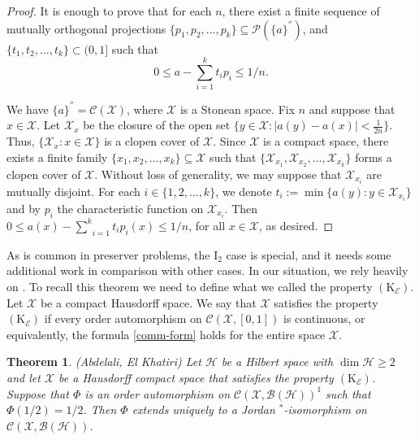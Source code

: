 \documentclass[12pt]{amsart}
\newtheorem{thm}{Theorem}[section]
\theoremstyle{definition}
\theoremstyle{remark}
\numberwithin{equation}{section}
\begin{document}
\begin{proof}
	
It is enough to prove that for each $n$, there exist a finite sequence  of  mutually orthogonal projections $\{p_1,p_2,...,p_k\}\subseteq\mathcal{P}(\{a\}^{''})$, and $\{t_1,t_2,...,t_k\}\subset(0,1]$ such that $$0 \leq a- \sum_{i=1}^{k} t_ip_i \leq 1/n. $$	
	
 	We have $\{a\}^{''} = \mathcal{C(X)}$, where $\mathcal{X}$ is a Stonean space. Fix $n$ and suppose that $x\in\mathcal{X}$. Let $\mathcal{X}_x$ be the closure of the open set $\{y\in\mathcal{X}: |a(y)-a(x)|<\frac{1}{2n}\}$. Thus, $\{\mathcal{X}_x: x\in \mathcal{X}\}$ is a clopen cover of $\mathcal{X}$. Since $\mathcal{X}$ is a compact space, there exists a finite family $\{x_1,x_2,...,x_k\}\subseteq \mathcal{X}$ such that $\{\mathcal{X}_{x_1},\mathcal{X}_{x_2},...,\mathcal{X}_{x_k}\}$  forms a clopen cover of $\mathcal{X}$. Without loss of generality, we may suppose  that $\mathcal{X}_{x_i}$  are mutually disjoint. For each $i\in\{1,2,...,k\}$,  we denote $t_i:=\min\{a(y):y\in\mathcal{X}_{x_i}\}$ and  by   $p_i$  the characteristic function on $\mathcal{X}_{x_i}$. Then $0\leq a(x)- \underset{i=1}{\overset{k}{\sum}} t_ip_i(x) \leq 1/n$, for all $x\in\mathcal{X}$, as desired.
\end{proof}













As is common in preserver problems,  the $\mathrm{I}_2$ case is  special, and
it needs some additional work in comparison with other cases. In our situation, we rely heavily  on  \cite[Theorem 2.4]{Our}. To recall this theorem we need to define what we called   the property $\left(\mathrm{K}_{\mathcal{E}}\right)$. Let  $\mathcal{X}$ be a compact  Hausdorff  space. We say that $\mathcal{X}$  satisfies the property $\left(\mathrm{K}_{\mathcal{E}}\right)$ if every order automorphism on $\mathcal{C}(\mathcal{X},[0,1])$  is continuous, or equivalently, the formula \eqref{comm-form} holds for the entire space $\mathcal{X}$.  



\begin{thm}\label{Abdelali.ElKhatiri}
(Abdelali,  El Khatiri) Let $\mathcal{H}$ be a Hilbert space with $\dim \mathcal{H}\geq 2$ and let  $\mathcal{X}$ be a Hausdorff compact space that satisfies  the property $\left(\mathrm{K}_{\mathcal{E}}\right)$. Suppose that $\Phi$ is an order automorphism   on $\mathcal{C}\left( \mathcal{X},\mathcal{B(H)}\right)^{1}$ such that $\Phi(1/2)=1/2$. Then $\Phi$    extends  uniquely  to a Jordan $^*$-isomorphism  on  $\mathcal{C}\left( \mathcal{X},\mathcal{B}(\mathcal{H})\right)$.
\end{thm}
\end{document}
